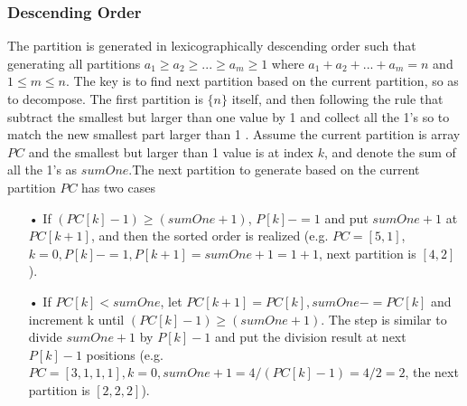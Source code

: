 \documentclass[catalog.tex]{subfiles}
\begin{document}
\subsubsection{Descending Order}
The partition is generated in lexicographically descending order such that generating all partitions $a_1 \geq a_2 \geq ... \geq a_m \geq 1$ where $a_1 + a_2 +...+a_m = n$ and $1 \leq m \leq n$. The key is to find next partition based on the current partition, so as to decompose. The first partition is $\{n \}$ itself, and then following the rule that subtract the smallest but larger than one value by 1 and collect all the 1's so to match the new smallest part larger than 1 \cite{1}. Assume the current partition is array $PC$ and the smallest but larger than 1 value is at index $k$, and denote the sum of all the 1's as $sumOne$.The next partition to generate based on the current partition $PC$ has two cases 
\begin{enumerate}
\item[•] If $(PC[k] - 1)\geq (sumOne+1)$, $P[k]-=1$ and put $sumOne + 1$ at $PC[k+1]$, and then the sorted order is realized (e.g. $PC=[5,1]$, $k=0, P[k]-=1,  P[k+1] = sumOne + 1=1 + 1$, next partition is $[4,2]$ ).
\item[•] If $PC[k] < sumOne$, let $PC[k+1] = PC[k], sumOne-=PC[k]$ and increment k until $(PC[k] - 1)\geq (sumOne+1)$. The step is similar to divide $sumOne+1$ by $P[k]-1$ and put the division result at next $P[k]-1$ positions (e.g. $PC = [3,1,1,1], k = 0, sumOne+1 = 4 / (PC[k]-1) = 4/2 = 2$, the next partition is $[2,2,2]$). 
\end{enumerate} 
\end{document}
